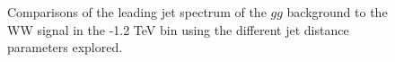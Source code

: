 \begin{figure}
\begin{center}
\caption{Comparisons of the leading jet \pt spectrum of the $gg$
  background to the WW signal in the -1.2 TeV bin using the
  different \antikt jet distance parameters explored.}
\label{fig:pt1000_basics}
\end{center}
\end{figure}





